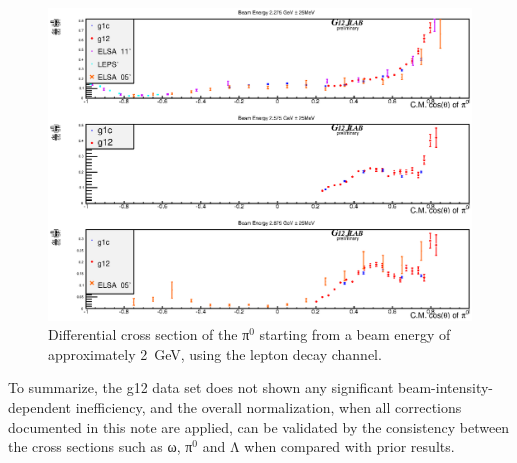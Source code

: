 \begin{figure}[htpb]
\includegraphics[width=0.95\columnwidth]{figures/xsec/G12_Pi0_XSection_forAnalysisNote_II.eps}
\caption{\label{fig:pi0.xsec.2}Differential cross section of the π$^0$ starting from a beam energy of approximately 2~GeV, using the lepton decay channel.}
\end{figure}

To summarize, the g12 data set does not shown any significant beam-intensity-dependent inefficiency, and the overall normalization, when all corrections documented in this note are applied, can be validated by the consistency between the cross sections such as ω, π$^0$ and Λ when compared with prior results.
